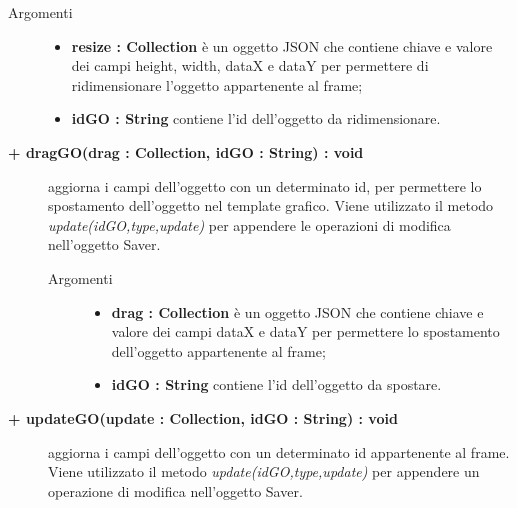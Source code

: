 \begin{description}
\begin{description}
\begin{description}
\begin{description}
			\item[Argomenti] \hfill
				\begin{itemize}
					\item \textbf{resize : Collection			} \hfill
					è un oggetto JSON che contiene chiave e valore dei campi height, width, dataX e dataY per permettere di ridimensionare l'oggetto appartenente al frame;
					\item \textbf{idGO : String			} \hfill
					contiene l'id dell'oggetto da ridimensionare.
				\end{itemize}

\end{description}

\end{description}

\begin{description}
		\item[\textbf{\color{blue}+ dragGO(drag : Collection, idGO : String) : void			}] \hfill
			aggiorna i campi dell'oggetto con un determinato id, per permettere lo spostamento dell'oggetto nel template grafico. Viene utilizzato il metodo \textit{update(idGO,type,update)} per appendere le operazioni di modifica nell'oggetto Saver.    

\begin{description}
			\item[Argomenti] \hfill
				\begin{itemize}
					\item \textbf{drag : Collection			} \hfill
					è un oggetto JSON che contiene chiave e valore dei campi dataX e dataY per permettere lo spostamento dell'oggetto appartenente al frame;
					\item \textbf{idGO : String			} \hfill
					contiene l'id dell'oggetto da spostare.
				\end{itemize}

\end{description}

\end{description}

\begin{description}
		\item[\textbf{\color{blue}+ updateGO(update : Collection, idGO : String) : void			}] \hfill
			aggiorna i campi dell'oggetto con un determinato id appartenente al frame. Viene utilizzato il metodo \textit{update(idGO,type,update)} per appendere un operazione di modifica nell'oggetto Saver. 


\end{description}
\end{description}
\end{description}
